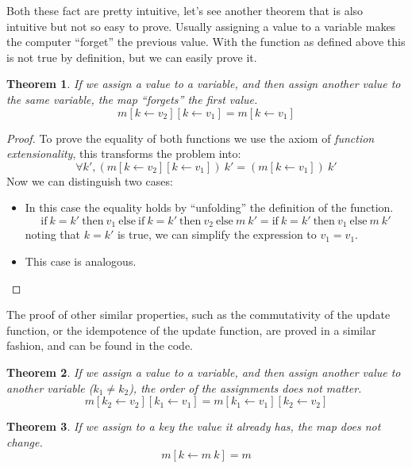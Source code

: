 \documentclass[
  a4paper, 
  10pt, 
  parskip=half, 
  DIV=20,
  toc=bibliography,
  usegeometry,
]{scrartcl}
\newtheorem{theorem}{Theorem}[section]
\newcommand{\funfont}[1]{\text{#1}}
\begin{document}
Both these fact are pretty intuitive, let's see another theorem that is also
intuitive but not so easy to prove. Usually assigning a value to a
variable makes the computer \enquote{forget} the previous value. With the
\funfont{update} function as defined above this is not true by definition,
but we can easily prove it.

\begin{theorem}
  If we assign a value to a variable, and then assign another value to the same
  variable, the map \enquote{forgets} the first value.
  \[
  m[k \leftarrow v_2][k \leftarrow v_1] = m[k \leftarrow v_1]
  \]
\end{theorem}

\begin{proof}
  To prove the equality of both functions we use the axiom of \emph{function
  extensionality}, this transforms the problem into:
  \[
  \forall k' , (m[k \leftarrow v_2][k \leftarrow v_1]) \ k' = (m[k \leftarrow v_1]) \ k'
  \]
  Now we can distinguish two cases:
  \begin{itemize}
    \item[(\(k = k'\))] In this case the equality holds by \enquote{unfolding} the
      definition of the \funfont{update} function.
      \[
        \text{if} \ k = k' \ \text{then} \ v_1 \ \text{else} \ 
          \text{if} \ k = k' \ \text{then} \ v_2 \ \text{else} \ m \ k' = 
          \text{if} \ k = k' \ \text{then} \ v_1 \ \text{else} \ m \ k'
      \]
      noting that \(k = k'\) is true, we can simplify the expression to \(v_1 = v_1\).
    \item[(\(k \neq k'\))] This case is analogous.
  \end{itemize}
\end{proof}

The proof of other similar properties, such as the commutativity of the update
function, or the idempotence of the update function, are proved in a similar
fashion, and can be found in the code.

\begin{theorem}
  If we assign a value to a variable, and then assign another value to another
  variable (\(k_1 \neq k_2\)), the order of the assignments does not matter.
  \[
  m[k_2 \leftarrow v_2][k_1 \leftarrow v_1] = m[k_1 \leftarrow v_1][k_2 \leftarrow v_2]
  \]
\end{theorem}

\begin{theorem}
  If we assign to a key the value it already has, the map does not change.
  \[
  m[k \leftarrow m \ k] = m
  \]
\end{theorem}
\end{document}
